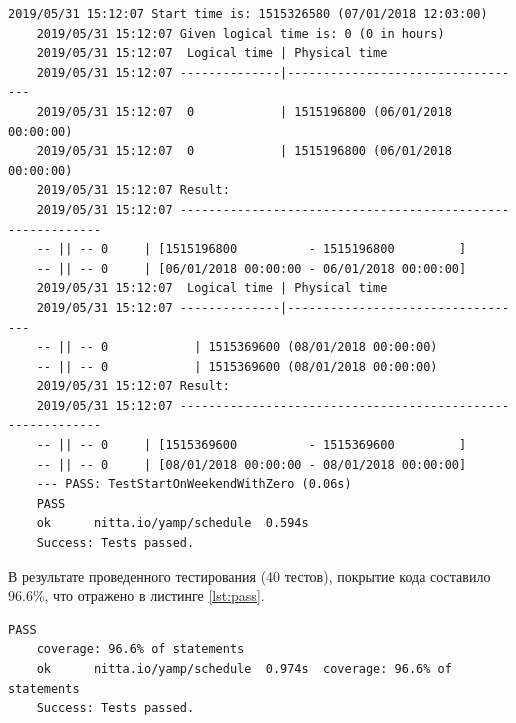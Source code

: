 
\begin{lstlisting}[caption={Пример анализа заданного физического времени},label={lst:checkEval}]
	2019/05/31 15:12:07 Start time is: 1515326580 (07/01/2018 12:03:00)
	2019/05/31 15:12:07 Given logical time is: 0 (0 in hours)
	2019/05/31 15:12:07  Logical time | Physical time
	2019/05/31 15:12:07 --------------|----------------------------------
	2019/05/31 15:12:07  0            | 1515196800 (06/01/2018 00:00:00)
	2019/05/31 15:12:07  0            | 1515196800 (06/01/2018 00:00:00)
	2019/05/31 15:12:07 Result:
	2019/05/31 15:12:07 -----------------------------------------------------------
	-- || -- 0     | [1515196800          - 1515196800         ]
	-- || -- 0     | [06/01/2018 00:00:00 - 06/01/2018 00:00:00]
	2019/05/31 15:12:07  Logical time | Physical time
	2019/05/31 15:12:07 --------------|----------------------------------
	-- || -- 0            | 1515369600 (08/01/2018 00:00:00)
	-- || -- 0            | 1515369600 (08/01/2018 00:00:00)
	2019/05/31 15:12:07 Result:
	2019/05/31 15:12:07 -----------------------------------------------------------
	-- || -- 0     | [1515369600          - 1515369600         ]
	-- || -- 0     | [08/01/2018 00:00:00 - 08/01/2018 00:00:00]
	--- PASS: TestStartOnWeekendWithZero (0.06s)
	PASS
	ok  	nitta.io/yamp/schedule	0.594s
	Success: Tests passed.
\end{lstlisting}

\indent В результате проведенного тестирования (40 тестов), покрытие кода составило 96.6\%, что отражено в листинге \ref{lst:pass}.

\begin{lstlisting}[caption={Тестовое покрытие кода},label={lst:pass}]
	PASS
	coverage: 96.6% of statements
	ok  	nitta.io/yamp/schedule	0.974s	coverage: 96.6% of statements
	Success: Tests passed.
\end{lstlisting}
